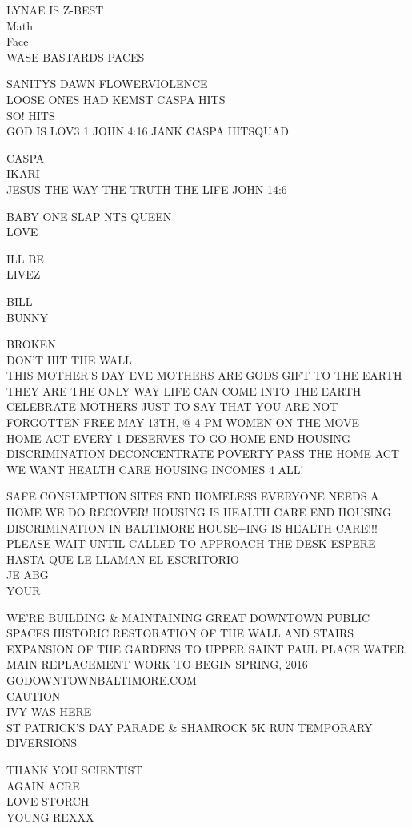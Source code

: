 \documentclass[10pt,letterpaper]{article}
\begin{document}
LYNAE IS Z{-}BEST\\
Math\\
Face\\
WASE BASTARDS PACES

SANITYS DAWN FLOWERVIOLENCE\\
LOOSE ONES HAD KEMST CASPA HITS\\
SO!  HITS\\
GOD IS LOV3 1 JOHN 4:16 JANK CASPA HITSQUAD

CASPA\\
IKARI\\
JESUS THE WAY THE TRUTH THE LIFE JOHN 14:6

BABY ONE SLAP NTS QUEEN\\
LOVE

ILL BE\\
LIVEZ

BILL\\
BUNNY

BROKEN\\
DON'T HIT THE WALL\\
THIS MOTHER'S DAY EVE MOTHERS ARE GODS GIFT TO THE EARTH THEY ARE THE ONLY WAY LIFE CAN COME INTO THE EARTH CELEBRATE MOTHERS JUST TO SAY THAT YOU ARE NOT FORGOTTEN FREE MAY 13TH, @ 4 PM WOMEN ON THE MOVE\\
HOME ACT EVERY 1 DESERVES TO GO HOME END HOUSING DISCRIMINATION DECONCENTRATE POVERTY PASS THE HOME ACT WE WANT HEALTH CARE HOUSING INCOMES 4 ALL!

SAFE CONSUMPTION SITES END HOMELESS EVERYONE NEEDS A HOME WE DO RECOVER!  HOUSING IS HEALTH CARE END HOUSING DISCRIMINATION IN BALTIMORE HOUSE+ING IS HEALTH CARE!!!\\
PLEASE WAIT UNTIL CALLED TO APPROACH THE DESK ESPERE HASTA QUE LE LLAMAN EL ESCRITORIO\\
JE ABG\\
YOUR

WE'RE BUILDING \& MAINTAINING GREAT DOWNTOWN PUBLIC SPACES HISTORIC RESTORATION OF THE WALL AND STAIRS EXPANSION OF THE GARDENS TO UPPER SAINT PAUL PLACE WATER MAIN REPLACEMENT WORK TO BEGIN SPRING, 2016 GODOWNTOWNBALTIMORE.COM\\
CAUTION\\
IVY WAS HERE\\
ST PATRICK'S DAY PARADE \& SHAMROCK 5K RUN TEMPORARY DIVERSIONS

THANK YOU SCIENTIST\\
AGAIN ACRE\\
LOVE STORCH\\
YOUNG REXXX
\end{document}

